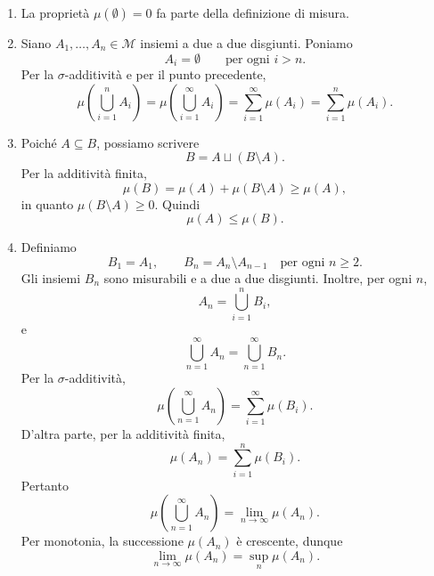 \documentclass[a4paper]{article}
\begin{document}
\begin{radioactive}
\begin{snippetproof}{}
    \begin{enumerate}
        \item La proprietà \(\mu(\emptyset)=0\) fa parte della definizione di misura.

        \item
            Siano \(A_1,\ldots,A_n \in \mathcal M\) insiemi a due a due disgiunti.
            Poniamo
            \[
                A_i = \emptyset
                \qquad
                \text{per ogni \(i > n\)}.
            \]
            Per la \(\sigma\)-additività e per il punto precedente,
            \[
                \mu\left(
                    \bigcup_{i=1}^{n} A_i
                \right)
                =
                \mu\left(
                    \bigcup_{i=1}^{\infty} A_i
                \right)
                =
                \sum_{i=1}^{\infty} \mu(A_i)
                =
                \sum_{i=1}^{n} \mu(A_i).
            \]
        \item
            Poiché \(A \subseteq B\), possiamo scrivere
            \[
                B = A \sqcup (B \setminus A).
            \]
            Per la additività finita,
            \[
                \mu(B)
                =
                \mu(A) + \mu(B \setminus A)
                \geq
                \mu(A),
            \]
            in quanto \(\mu(B \setminus A) \geq 0\). Quindi
            \[
                \mu(A) \leq \mu(B).
            \]

        \item
            Definiamo
            \[
                B_1 = A_1,
                \qquad
                B_n = A_n \setminus A_{n-1}
                \quad
                \text{per ogni \(n \geq 2\)}.
            \]
            Gli insiemi \(B_n\) sono misurabili e a due a due disgiunti.
            Inoltre, per ogni \(n\),
            \[
                A_n
                =
                \bigcup_{i=1}^{n} B_i,
            \]
            e
            \[
                \bigcup_{n=1}^{\infty} A_n
                =
                \bigcup_{n=1}^{\infty} B_n.
            \]
            Per la \(\sigma\)-additività,
            \[
                \mu\left(
                    \bigcup_{n=1}^{\infty} A_n
                \right)
                =
                \sum_{i=1}^{\infty} \mu(B_i).
            \]
            D'altra parte, per la additività finita,
            \[
                \mu(A_n)
                =
                \sum_{i=1}^{n} \mu(B_i).
            \]
            Pertanto
            \[
                \mu\left(
                    \bigcup_{n=1}^{\infty} A_n
                \right)
                =
                \lim_{n \to \infty} \mu(A_n).
            \]
            Per monotonia, la successione \(\mu(A_n)\) è crescente, dunque
            \[
                \lim_{n \to \infty} \mu(A_n)
                =
                \sup_n \mu(A_n).
            \]


\end{enumerate}
\end{snippetproof}
\end{radioactive}
\end{document}
